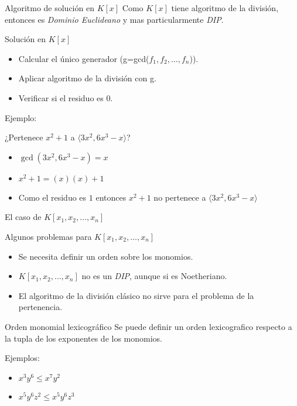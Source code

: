 \documentclass[10pt]{beamer}
\newcommand{\gen}[1]{\ensuremath{\langle #1\rangle}}
\begin{document}
\begin{frame}{Algoritmo de solución en $K[x]$}
	Como $K[x]$ tiene algoritmo de la división, entonces es \emph{Dominio Euclideano} y mas particularmente \emph{DIP}.
	\begin{block}{Solución en $K[x]$}
		\begin{itemize}
			\item Calcular el único generador (g=gcd($f_1,f_2,\ldots,f_n$)).
			\item Aplicar algoritmo de la división con g.
			\item Verificar si el residuo es $0$.
		\end{itemize}
	\end{block}

	\pause
	Ejemplo:

	¿Pertenece $x^2+1$ a $\gen{3x^2, 6x^3-x}$?
	\begin{itemize}
		\item $\gcd(3x^2, 6x^3-x) = x$
		\item $x^2+1 = (x)(x)+1$
		\item Como el residuo es $1$ entonces $x^2+1$ no pertenece a $\gen{3x^2, 6x^3-x}$
	\end{itemize}
\end{frame}

\begin{frame}{El caso de $K[x_1,x_2,\ldots,x_n]$}
	\begin{block}{Algunos problemas para $K[x_1,x_2,\ldots,x_n]$}
		\begin{itemize}
			\item Se necesita definir un orden sobre los monomios.
			\item $K[x_1,x_2,\ldots,x_n]$ no es un \emph{DIP}, aunque si es Noetheriano.
			\item El algoritmo de la división clásico no sirve para el problema de la pertenencia. 
		\end{itemize}
	\end{block}
	\begin{block}{Orden monomial lexicográfico}
		Se puede definir un orden lexicografico respecto a la tupla de los exponentes de los monomios.
		
		Ejemplos:
		\begin{itemize}
			\item $x^3y^6 \leq x^7y^2$
			\item $x^5y^6z^2 \leq x^5y^6z^3$
		\end{itemize}
	\end{block}
\end{frame}
\end{document}
